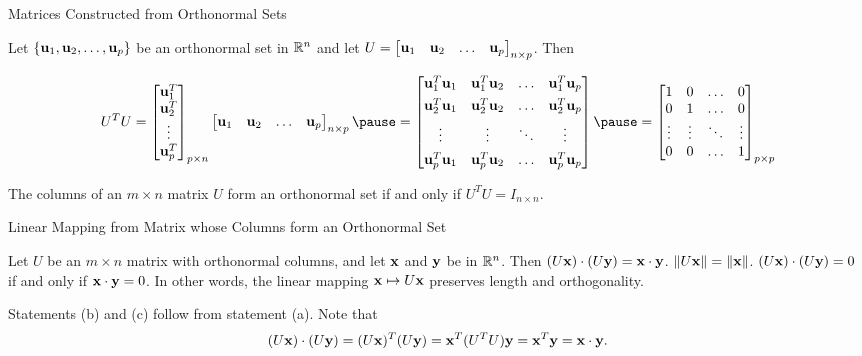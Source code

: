\documentclass[xcolor=dvipsnames,aspectratio=169,t]{beamer}
\begin{document}
\begin{frame}{Matrices Constructed from Orthonormal Sets}
  \bigskip

  Let $\left\{ \mathbf{u}_1, \mathbf{u}_2, \ldots, \mathbf{u}_p \right\}$ be an \alert{orthonormal set} in $\mathbb{R}^n$ and let $U = \begin{bmatrix} \mathbf{u}_1 & \mathbf{u}_2 & \ldots & \mathbf{u}_p \end{bmatrix}_{n\times p}$. Then

  {\small
  \[ U^TU = \begin{bmatrix} \u_1^T \\ \u_2^T \\ \vdots \\ \u_p^T \end{bmatrix}_{p \times n} \begin{bmatrix} \u_1 & \u_2 & \ldots & \u_p \end{bmatrix}_{n \times p} 
  \pause =
  \begin{bmatrix} \u_1^T  \u_1 & \u_1^T \u_2 & \ldots &  \u_1^T \u_p \\[.4em]
  \u_2^T \u_1 & \u_2^T \u_2 & \ldots & \u_2^T \u_p \\[.4em]
  \vdots      & \vdots      & \ddots & \vdots \\[.4em]
  \u_p^T \u_1 & \u_p^T \u_2 & \ldots & \u_p^T \u_p \end{bmatrix}
  \pause
  = \begin{bmatrix}
    1 & 0 & \ldots & 0 \\ 
    0 & 1 & \ldots & 0 \\ 
    \vdots & \vdots & \ddots & \vdots \\
    0 & 0 & \ldots & 1 \end{bmatrix}_{p\times p} 
  \]
  }
  \vspace*{1em}
  
  \pause
  \begin{theorem}
  The columns of an $m \times n$ matrix $U$ form an \alert{orthonormal set} if and only if $U^TU=I_{n\times n}$.
  \end{theorem}
\end{frame}


\begin{frame}{Linear Mapping from Matrix whose Columns form an Orthonormal Set}
  \medskip

  \begin{theorem}
  Let $U$ be an $m \times n$ matrix with orthonormal columns, 
  and let $\mathbf{x}$ and $\mathbf{y}$ be in $\mathbb{R}^n$. Then
  \bb[(a)]
  \ii $(U \mathbf{x}) \cdot (U \mathbf{y}) = \mathbf{x} \cdot \mathbf{y}$.  \smallskip
  \ii $\| U\mathbf{x} \| = \| \mathbf{x} \|$.  \smallskip
  \ii $(U \mathbf{x}) \cdot (U \mathbf{y}) = 0$ if and only if $\mathbf{x} \cdot \mathbf{y}=0$.  \smallskip
  \ee
  In other words, the linear mapping $\mathbf{x} \mapsto U\mathbf{x}$ preserves \alert{length} and \alert{orthogonality}.
  \end{theorem}
  \bigskip

  \pause
  
  Statements (b) and (c) follow from statement (a).
  Note that
    \[ (U \mathbf{x}) \cdot (U \mathbf{y}) = (U \mathbf{x})^T (U \mathbf{y}) = \mathbf{x}^T (U^T U) \mathbf{y} = \mathbf{x}^T \mathbf{y} = \mathbf{x} \cdot \mathbf{y}. \]
    
  \vspace*{-2em}
  \hfill\blue{$\qed$}
\end{frame}
\end{document}
